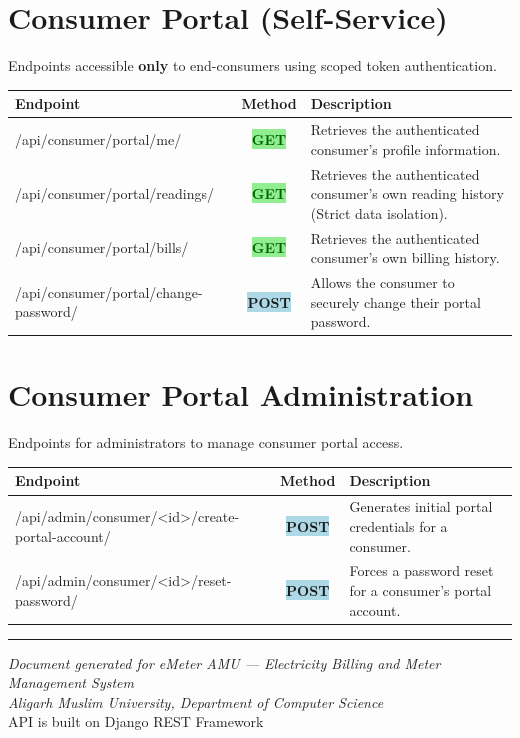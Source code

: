 \documentclass[12pt, a4paper]{report}
\newcommand{\httpget}{\colorbox{lightGreen}{\textcolor{darkGreen}{\textbf{\small GET}}}}
\newcommand{\httppost}{\colorbox{lightBlue}{\textcolor{deepBlue}{\textbf{\small POST}}}}
\begin{document}
\section{Consumer Portal (Self-Service)}
Endpoints accessible \textbf{only} to end-consumers using scoped token authentication. 

\begin{table}[H]
\centering
\begin{tabularx}{\textwidth}{>{\ttfamily\raggedright\arraybackslash}p{} c X}
\toprule
\textbf{Endpoint} & \textbf{Method} & \textbf{Description} \\
\midrule
/api/consumer/portal/me/ & \httpget & Retrieves the authenticated consumer's profile information. \\
/api/consumer/portal/readings/ & \httpget & Retrieves the authenticated consumer's own reading history (Strict data isolation). \\
/api/consumer/portal/bills/ & \httpget & Retrieves the authenticated consumer's own billing history. \\
/api/consumer/portal/change-password/ & \httppost & Allows the consumer to securely change their portal password. \\
\bottomrule
\end{tabularx}
\end{table}

\section{Consumer Portal Administration}
Endpoints for administrators to manage consumer portal access.

\begin{table}[H]
\centering
\begin{tabularx}{\textwidth}{>{\ttfamily\raggedright\arraybackslash}p{} c X}
\toprule
\textbf{Endpoint} & \textbf{Method} & \textbf{Description} \\
\midrule
/api/admin/consumer/<id>/create-portal-account/ & \httppost & Generates initial portal credentials for a consumer. \\
/api/admin/consumer/<id>/reset-password/ & \httppost & Forces a password reset for a consumer's portal account. \\
\bottomrule
\end{tabularx}
\end{table}

\vspace{2em}
\hrule
\vspace{1em}

\begin{center}
\textit{Document generated for eMeter AMU — Electricity Billing and Meter Management System}\\[0.2cm]
\textit{Aligarh Muslim University, Department of Computer Science}\\[0.2cm]
{\small API is built on Django REST Framework}
\end{center}
\end{document}
